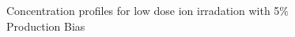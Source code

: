 \documentclass[a4paper]{article}
\begin{document}
      \begin{figure}[h!]  %
        \centering
        \qquad
        \caption{Concentration profiles for low dose ion irradation with 5\% Production Bias}
        \label{figure:concentrations_ion_5_1e-6}
      \end{figure}
\end{document}
